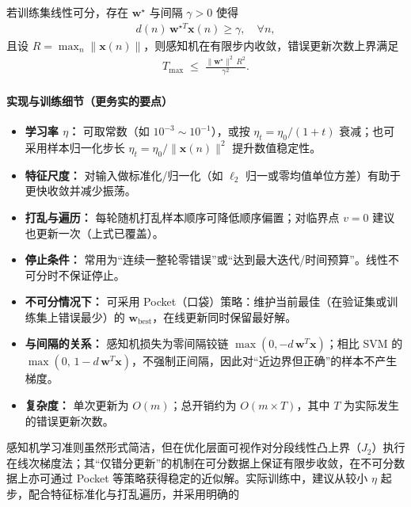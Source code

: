 \begin{theorem}[感知机收敛定理]
若训练集线性可分，存在 $\boldsymbol{w}^\star$ 与间隔 $\gamma>0$ 使得
\begin{align}
d(n)\,\boldsymbol{w}^{\star T}\boldsymbol{x}(n)\ge \gamma,\quad \forall n,
\end{align}
且设 $R=\max_n \|\boldsymbol{x}(n)\|$，则感知机在有限步内收敛，错误更新次数上界满足
\begin{align}
T_{\max}\;\le\;\frac{\|\boldsymbol{w}^\star\|^2\,R^2}{\gamma^2}.
\end{align}
\end{theorem}


\paragraph{实现与训练细节（更务实的要点）}
\begin{itemize}
  \item \textbf{学习率 $\eta$：} 可取常数（如 $10^{-3}\!\sim\!10^{-1}$），或按 $\eta_t=\eta_0/(1+t)$ 衰减；也可采用样本归一化步长 $\eta_t=\eta_0/\|\boldsymbol{x}(n)\|^2$ 提升数值稳定性。
  \item \textbf{特征尺度：} 对输入做标准化/归一化（如 $\ell_2$ 归一或零均值单位方差）有助于更快收敛并减少振荡。
  \item \textbf{打乱与遍历：} 每轮随机打乱样本顺序可降低顺序偏置；对临界点 $v=0$ 建议也更新一次（上式已覆盖）。
  \item \textbf{停止条件：} 常用为“连续一整轮零错误”或“达到最大迭代/时间预算”。线性不可分时不保证停止。
  \item \textbf{不可分情况下：} 可采用 Pocket（口袋）策略：维护当前最佳（在验证集或训练集上错误最少）的 $\boldsymbol{w}_{\text{best}}$，在线更新同时保留最好解。
  \item \textbf{与间隔的关系：} 感知机损失为零间隔铰链 $\max(0,-d\,\boldsymbol{w}^T\boldsymbol{x})$；相比 SVM 的 $\max(0,\,1-d\,\boldsymbol{w}^T\boldsymbol{x})$，不强制正间隔，因此对“近边界但正确”的样本不产生梯度。
  \item \textbf{复杂度：} 单次更新为 $O(m)$；总开销约为 $O(m\times T)$，其中 $T$ 为实际发生的错误更新次数。
\end{itemize}

感知机学习准则虽然形式简洁，但在优化层面可视作对分段线性凸上界（$J_2$）执行在线次梯度法；其“仅错分更新”的机制在可分数据上保证有限步收敛，在不可分数据上亦可通过 Pocket 等策略获得稳定的近似解。实际训练中，建议从较小 $\eta$ 起步，配合特征标准化与打乱遍历，并采用明确的
